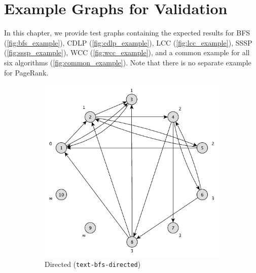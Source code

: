 \chapter{Example Graphs for Validation}
\label{chap:validation_examples}

In this chapter, we provide test graphs containing the expected results for
BFS (\autoref{fig:bfs_example}),
CDLP (\autoref{fig:cdlp_example}),
LCC (\autoref{fig:lcc_example}),
SSSP (\autoref{fig:sssp_example}),
WCC (\autoref{fig:wcc_example}),
and a common example for all six algorithms (\autoref{fig:common_example}). Note that there is no separate example for PageRank.

\newcommand{\examplescale}{0.48}

\begin{figure}[h]
	\centering
	\begin{subfigure}{0.496\textwidth}
		\centering
		\includegraphics[scale=\examplescale]{figures/examples/bfs-dir.pdf}
		\caption{Directed (\texttt{text-bfs-directed})}
	\end{subfigure}
	\begin{subfigure}{0.496\textwidth}
		\centering

\end{subfigure}
\end{figure}
